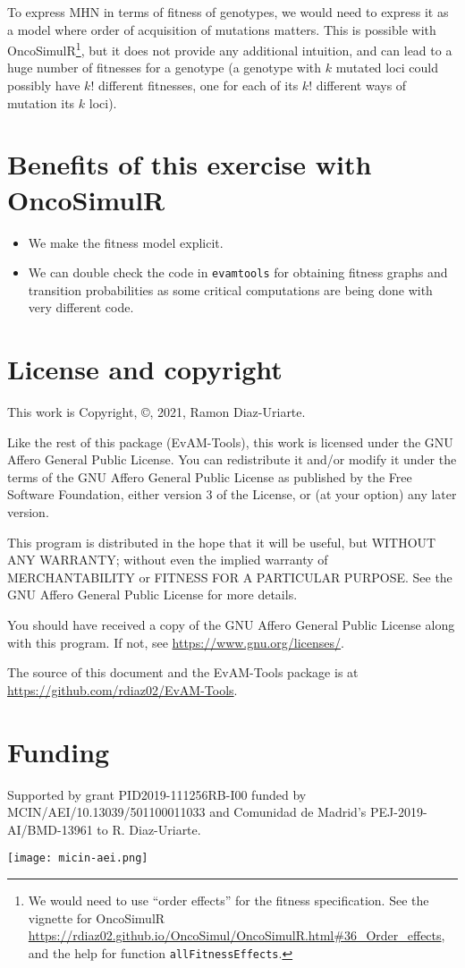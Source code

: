 \documentclass[11pt]{article}
\begin{document}
To express MHN in terms of fitness of genotypes, we would need to express it as a model where order of acquisition of mutations matters. This is possible with OncoSimulR\footnote{We would need to use ``order effects'' for the fitness specification. See the vignette for OncoSimulR  \url{https://rdiaz02.github.io/OncoSimul/OncoSimulR.html\#36\_Order\_effects},  and the help for function \texttt{allFitnessEffects}.
}, but it does not provide any additional intuition, and can lead to a huge number of fitnesses for a genotype (a genotype with $k$ mutated loci could possibly have $k!$ different fitnesses, one for each of its $k!$ different ways of mutation its $k$ loci).


\section{Benefits of this exercise with OncoSimulR}
\label{sec:org4a55091}
\begin{itemize}
\item We make the fitness model explicit.
\item We can double check the code in \texttt{evamtools} for obtaining fitness graphs and transition probabilities as some critical computations are being done with very different code.
\end{itemize}



\section{License and copyright}
This work is Copyright, \copyright, 2021, Ramon Diaz-Uriarte.

Like the rest of this package (EvAM-Tools), this work is licensed under the GNU Affero General Public License. You can redistribute it and/or modify it under the terms of the GNU Affero General Public License as published by the Free Software Foundation, either version 3 of the License, or (at your option) any later version.

This program is distributed in the hope that it will be useful, but WITHOUT ANY WARRANTY; without even the implied warranty of MERCHANTABILITY or FITNESS FOR A PARTICULAR PURPOSE. See the GNU Affero General Public License for more details.

You should have received a copy of the GNU Affero General Public License along with this program. If not, see \url{https://www.gnu.org/licenses/}. 

The source of this document and the EvAM-Tools package is at \url{https://github.com/rdiaz02/EvAM-Tools}.

\section{Funding}
Supported by grant PID2019-111256RB-I00 funded by MCIN/AEI/10.13039/501100011033 and Comunidad de Madrid's PEJ-2019-AI/BMD-13961 to R. Diaz-Uriarte.
\begin{center}
\texttt{[image: micin-aei.png]}\\
\end{center}
\end{document}
